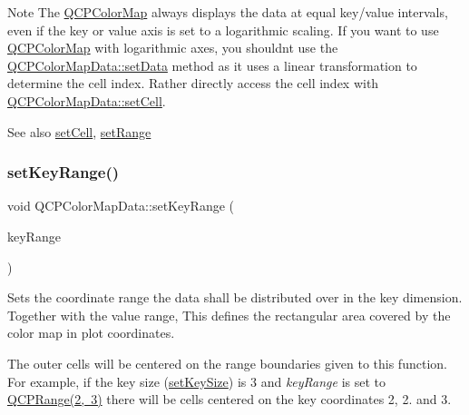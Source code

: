 \begin{DoxyNote}{Note}
The \mbox{\hyperlink{class_q_c_p_color_map}{Q\+C\+P\+Color\+Map}} always displays the data at equal key/value intervals, even if the key or value axis is set to a logarithmic scaling. If you want to use \mbox{\hyperlink{class_q_c_p_color_map}{Q\+C\+P\+Color\+Map}} with logarithmic axes, you shouldn\textquotesingle{}t use the \mbox{\hyperlink{class_q_c_p_color_map_data_afd2083ccfd6987ec94aa7ef8e91ca39a}{Q\+C\+P\+Color\+Map\+Data\+::set\+Data}} method as it uses a linear transformation to determine the cell index. Rather directly access the cell index with \mbox{\hyperlink{class_q_c_p_color_map_data_a8e75eaf8746596319032a93f3d2d0683}{Q\+C\+P\+Color\+Map\+Data\+::set\+Cell}}.
\end{DoxyNote}
\begin{DoxySeeAlso}{See also}
\mbox{\hyperlink{class_q_c_p_color_map_data_a8e75eaf8746596319032a93f3d2d0683}{set\+Cell}}, \mbox{\hyperlink{class_q_c_p_color_map_data_aad9c1c7c703c1339489fc730517c83d4}{set\+Range}} 
\end{DoxySeeAlso}
\mbox{\label{class_q_c_p_color_map_data_a0738c485f3c9df9ea1241b7a8bb6a86e}} 
\subsubsection{\texorpdfstring{set\+Key\+Range()}{setKeyRange()}}
{\footnotesize\ttfamily void Q\+C\+P\+Color\+Map\+Data\+::set\+Key\+Range (\begin{DoxyParamCaption}\item[{const \mbox{\hyperlink{class_q_c_p_range}{Q\+C\+P\+Range}} \&}]{key\+Range }\end{DoxyParamCaption})}

Sets the coordinate range the data shall be distributed over in the key dimension. Together with the value range, This defines the rectangular area covered by the color map in plot coordinates.

The outer cells will be centered on the range boundaries given to this function. For example, if the key size (\mbox{\hyperlink{class_q_c_p_color_map_data_ac7ef70e383aface34b44dbde49234b6b}{set\+Key\+Size}}) is 3 and {\itshape key\+Range} is set to {\ttfamily \mbox{\hyperlink{class_q_c_p_range}{Q\+C\+P\+Range(2, 3)}}} there will be cells centered on the key coordinates 2, 2. and 3.

